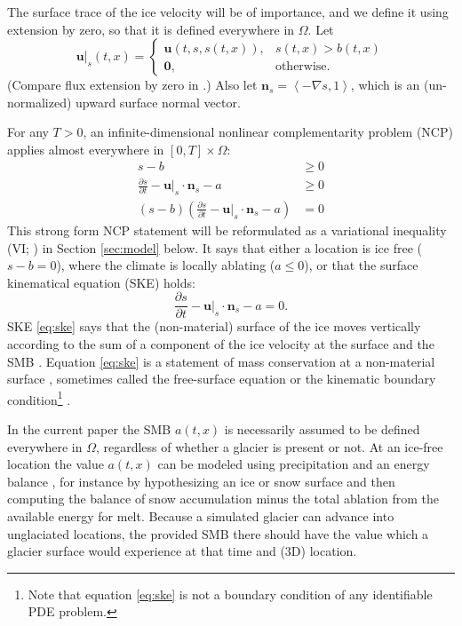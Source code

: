 \documentclass[hidelinks,onefignum,onetabnum,final]{siamart220329}  %
\newcommand{\grad}{\nabla}
\newcommand{\bn}{\mathbf{n}}
\newcommand{\bu}{\mathbf{u}}
\newcommand{\bzero}{\bm{0}}
\begin{document}
The surface trace of the ice velocity will be of importance, and we define it using extension by zero, so that it is defined everywhere in $\Omega$.  Let
\begin{equation}
\bu|_s(t,x) = \begin{cases} \bu(t,s,s(t,x)), & s(t,x)>b(t,x) \\
                            \bzero, & \text{otherwise} .\end{cases} \label{eq:defineus}
\end{equation}
(Compare flux extension by zero in \cite{SchoofHewitt2013}.)  Also let $\bn_s = \left<-\grad s,1\right>$, which is an (un-normalized) upward surface normal vector.

For any $T>0$, an infinite-dimensional nonlinear complementarity problem (NCP) \cite{Bueler2021conservation,FacchineiPang2003,SchoofHewitt2013} applies almost everywhere in $[0,T]\times \Omega$:
\begin{subequations}
\label{eq:ncp}
\begin{align}
s - b &\ge 0 \\
\frac{\partial s}{\partial t} - \bu|_s \cdot \bn_s - a &\ge 0 \\
(s - b) \left(\frac{\partial s}{\partial t} - \bu|_s \cdot \bn_s - a\right) &= 0
\end{align}
\end{subequations}
This strong form NCP statement will be reformulated as a variational inequality (VI; \cite{KinderlehrerStampacchia1980}) in Section \ref{sec:model} below.  It says that either a location is ice free ($s-b=0$), where the climate is locally ablating ($a\le 0$), or that the surface kinematical equation (SKE) holds:
\begin{equation}
\frac{\partial s}{\partial t} - \bu|_s \cdot \bn_s - a = 0.  \label{eq:ske}
\end{equation}
SKE \eqref{eq:ske} says that the (non-material) surface of the ice moves vertically according to the sum of a component of the ice velocity at the surface and the SMB \cite{SchoofHewitt2013}.  Equation \eqref{eq:ske} is a statement of mass conservation at a non-material surface \cite{Aschwandenetal2012}, sometimes called the free-surface equation \cite{LofgrenAhlkronaHelanow2022} or the kinematic boundary condition\footnote{Note that equation \eqref{eq:ske} is not a boundary condition of any identifiable PDE problem.} \cite{GreveBlatter2009}.

In the current paper the SMB $a(t,x)$ is necessarily assumed to be defined everywhere in $\Omega$, regardless of whether a glacier is present or not.  At an ice-free location the value $a(t,x)$ can be modeled using precipitation and an energy balance \cite{GreveBlatter2009}, for instance by hypothesizing an ice or snow surface and then computing the balance of snow accumulation minus the total ablation from the available energy for melt.  Because a simulated glacier can advance into unglaciated locations, the provided SMB there should have the value which a glacier surface would experience at that time and (3D) location.
\end{document}
